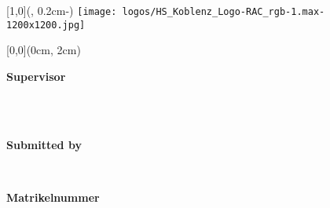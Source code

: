 {
\setlength{\parindent}{0cm}
\textblockorigin{\SeitenrandLinks}{\SeitenrandOben} %

\TabPositions{4cm}
\thispagestyle{empty}

\begin{textblock*}{\UniversitaetLogoBreite}[1,0](\textwidth-11mm, 0.2cm-\SeitenrandOben)%
    \raggedleft\texttt{[image: logos/HS\_Koblenz\_Logo-RAC\_rgb-1.max-1200x1200.jpg]}%
\end{textblock*}

\begin{textblock*}{\textwidth}[0,0](0cm, 2cm)%
{\fontsize{24pt}{26pt}\selectfont\textbf{\getTitle}}

\end{textblock*}

\vspace*{126.2mm}
\fontsize{15pt}{17.5pt}\selectfont%

\normalsize\selectfont
\vspace*{6.3mm}


\textbf{Supervisor} \tab
\begin{minipage}[t]{\textwidth-\CurrentLineWidth}
\begin{sloppypar}
\getSupervisor\\
{\selectfont {\getChair}}\\
\end{sloppypar}
\end{minipage}

\vspace*{6.3mm}
\textbf{Submitted by} \tab
\begin{minipage}[t]{\textwidth-\CurrentLineWidth}
\getAuthor{}\\
{\selectfont {\getEmail}}
\end{minipage}

\vspace*{6.3mm}
\textbf{Matrikelnummer} \tab
\begin{minipage}[t]{\textwidth-\CurrentLineWidth}
\getMatrikelnummer\strut
\end{minipage}

}
